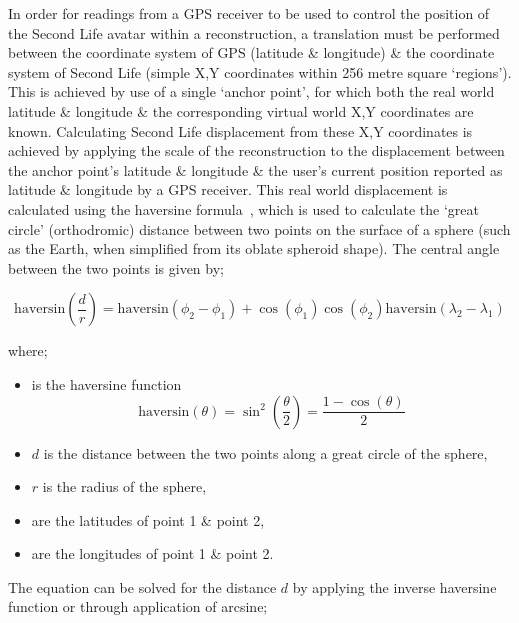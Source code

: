 
In order for readings from a GPS receiver to be used to control the position of the Second Life avatar within a reconstruction, a translation must be performed between the coordinate system of GPS (latitude \& longitude) \& the coordinate system of Second Life (simple X,Y coordinates within 256 metre square `regions'). This is achieved by use of a single `anchor point', for which both the real world latitude \& longitude \& the corresponding virtual world X,Y coordinates are known. Calculating Second Life displacement from these X,Y coordinates is achieved by applying the scale of the reconstruction to the displacement between the anchor point's latitude \& longitude \& the user's current position reported as latitude \& longitude by a GPS receiver. This real world displacement is calculated using the haversine formula~\cite{VanBrummelen2012}, which is used to calculate the `great circle' (orthodromic) distance between two points on the surface of a sphere (such as the Earth, when simplified from its oblate spheroid shape). The central angle  between the two points is given by;

\begin{equation}
\label{haversine1}
\text{haversin}\left(\frac{d}{r}\right) = \text{haversin}(\phi_{2}-\phi_{1})+\cos(\phi_{1})\cos(\phi_{2})\text{haversin}(\lambda_{2}-\lambda_{1})
\end{equation}

where;

\begin{itemize}
	\item {} is the haversine function
		\begin{equation}
		\label{harsine2}
			\text{haversin}(\theta) = \sin^{2}\left( \frac{\theta}{2}\right) = \frac{1-\cos(\theta)}{2}
		\end{equation}
	\item $d$ is the distance between the two points along a great circle of the sphere,
	\item $r$ is the radius of the sphere,
	\item {} are the latitudes of point 1 \& point 2,
	\item {} are the longitudes of point 1 \& point 2.
\end{itemize}

The equation can be solved for the distance $d$ by applying the inverse haversine function or through application of arcsine;

